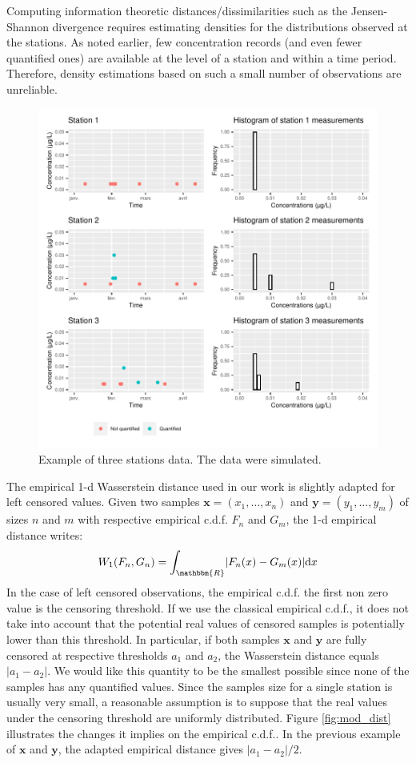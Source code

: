 \begin{appendices}
Computing information theoretic distances/dissimilarities such as the Jensen-Shannon divergence requires estimating densities for the distributions observed at the stations. As noted earlier, few concentration records (and even fewer quantified ones) are available at the level of a station and within a time period. Therefore, density estimations based on such a small number of observations are unreliable.

\begin{figure}[ht]
    \centering
    \includegraphics{figs/App/Simu_ex.pdf}
    \caption{Example of three stations data. The data were simulated.}
    \label{fig:ex_dist}
\end{figure}

The empirical 1-d Wasserstein distance used in our work is slightly adapted for left censored values. Given two samples $\bm{x}=(x_1,\dots,x_n)$ and $\bm{y}=(y_1,\dots,y_m)$ of sizes $n$ and $m$ with respective empirical c.d.f. $F_n$ and $G_m$, the 1-d empirical distance writes:
$$W_1(F_n,G_n) = \int_{\mathbbm{R}}\lvert F_n(x)-G_m(x) \rvert\mathrm{d}x$$
In the case of left censored observations, the empirical c.d.f. the first non zero value is the censoring threshold. If we use the classical empirical c.d.f., it does not take into account that the potential real values of censored samples is potentially lower than this threshold. In particular, if both samples $\bm{x}$ and $\bm{y}$ are fully censored at respective thresholds $a_1$ and $a_2$, the Wasserstein distance equals $\lvert a_1-a_2 \rvert$. We would like this quantity to be the smallest possible since none of the samples has any quantified values. Since the samples size for a single station is usually very small, a reasonable assumption is to suppose that the real values under the censoring threshold are uniformly distributed. Figure \ref{fig:mod_dist} illustrates the changes it implies on the empirical c.d.f.. In the previous example of $\bm{x}$ and $\bm{y}$, the adapted empirical distance gives $\lvert a_1-a_2\rvert/2$.    


\end{appendices}
